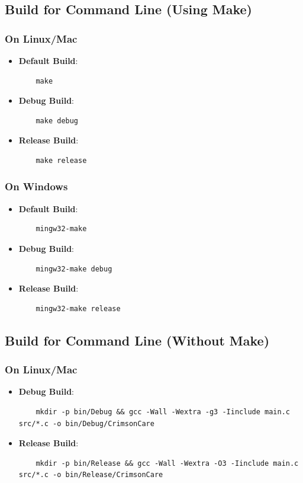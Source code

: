 \documentclass[12pt,a4paper]{report}
\begin{document}
\subsection{Build for Command Line (Using Make)}
\subsubsection{On Linux/Mac}
\begin{itemize}
    \item \normalsize \textbf{Default Build}:
    \begin{verbatim}
    make
    \end{verbatim}
    \item \normalsize \textbf{Debug Build}:
    \begin{verbatim}
    make debug
    \end{verbatim}
    \item \normalsize \textbf{Release Build}:
    \begin{verbatim}
    make release
    \end{verbatim}
\end{itemize}

\subsubsection{On Windows}
\begin{itemize}
    \item \normalsize \textbf{Default Build}:
    \begin{verbatim}
    mingw32-make
    \end{verbatim}
    \item \normalsize \textbf{Debug Build}:
    \begin{verbatim}
    mingw32-make debug
    \end{verbatim}
    \item \normalsize \textbf{Release Build}:
    \begin{verbatim}
    mingw32-make release
    \end{verbatim}
\end{itemize}

\subsection{Build for Command Line (Without Make)}
\subsubsection{On Linux/Mac}
\begin{itemize}
    \item \normalsize \textbf{Debug Build}:
    \begin{verbatim}
    mkdir -p bin/Debug && gcc -Wall -Wextra -g3 -Iinclude main.c src/*.c -o bin/Debug/CrimsonCare
    \end{verbatim}
    \item \normalsize \textbf{Release Build}:
    \begin{verbatim}
    mkdir -p bin/Release && gcc -Wall -Wextra -O3 -Iinclude main.c src/*.c -o bin/Release/CrimsonCare
    \end{verbatim}
\end{itemize}
\end{document}
